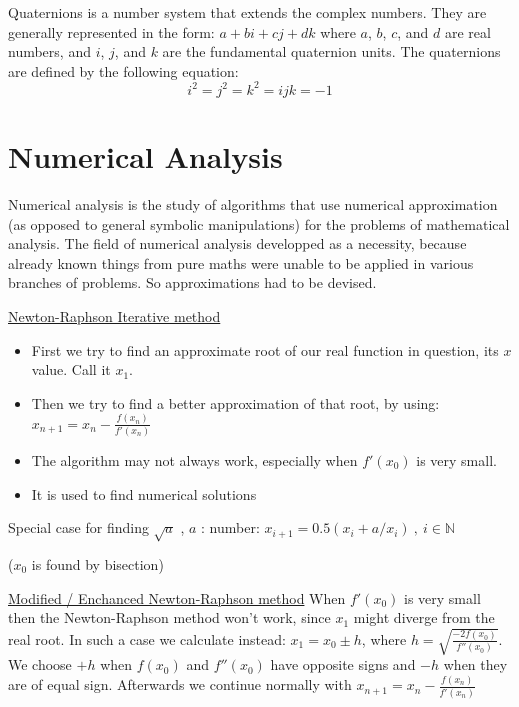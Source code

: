 \documentclass[12pt]{article}
\begin{document}
\begin{flushleft}
	Quaternions is a number system that extends the complex numbers. They are generally represented in the form: \linebreak 
	$\displaystyle a + bi + cj + dk$ \linebreak 
	where $a$, $b$, $c$, and $d$ are real numbers, and $i$, $j$, and $k$ are the fundamental quaternion units. \linebreak 
	\textbullet \quad The quaternions are defined by the following equation: 
	$$ i^2 = j^2 = k^2 = ijk = -1 $$ 
	

	\pagebreak
	
	
	\section{Numerical Analysis}
	
	\textbullet \quad Numerical analysis is the study of algorithms that use numerical approximation (as opposed to general symbolic manipulations) for the problems of mathematical analysis. The field of numerical analysis developped as a necessity, because already known things from pure maths were unable to be applied in various branches of problems. So approximations had to be devised. \linebreak 
	
	\uline{Newton-Raphson Iterative method}  
	\begin{itemize}
		\renewcommand{\labelitemi}{$\rightarrow$} 
	\item First we try to find an approximate root of our real function in question, its $x$ value. Call it $x_1$. 
	\item Then we try to find a better approximation of that root, by using: $\displaystyle x_{n+1} = x_n - \frac{f(x_n)}{f'(x_n)} $ 
	\item The algorithm may not always work, especially when $f'(x_0)$ is very small. 
	\item It is used to find numerical solutions
	\end{itemize}
	\textbullet \quad Special case for finding $\sqrt{a}$ , $a$  :  number: $\displaystyle x_{i+1} = 0.5 (x_i + a / x_i)\ , \ i\in \mathbb{N} $ \begin{small} ($x_0$ is found by bisection) \end{small} 
	
	\uline{Modified / Enchanced Newton-Raphson method} \linebreak 
	When $f'(x_0)$ is very small then the Newton-Raphson method won't work, since $x_1$ might diverge from the real root. In such a case we calculate instead: \linebreak 
	$x_1 = x_0 \pm h$, where $\displaystyle h= \sqrt{\frac{-2f(x_0)}{f''(x_0)}}$. We choose $+h$ when $f(x_0)$ and $f''(x_0)$ have opposite signs and $-h$ when they are of equal sign. \linebreak 
	Afterwards we continue normally with $\displaystyle x_{n+1} = x_n - \frac{f(x_n)}{f'(x_n)}$ \linebreak 
	

\end{flushleft}
\end{document}
